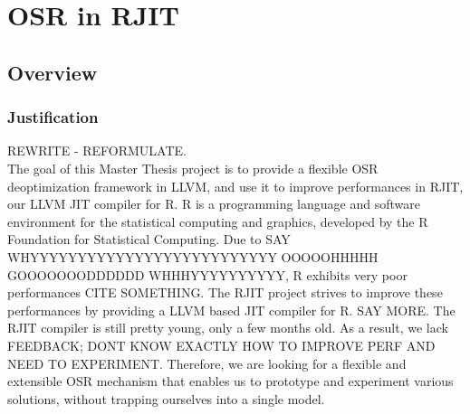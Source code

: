 
\chapter{OSR in RJIT} %

\label{Chapter4New} %


\newcommand{\keyword}[1]{\textbf{#1}}
\newcommand{\tabhead}[1]{\textbf{#1}}
\newcommand{\code}[1]{\texttt{#1}}
\newcommand{\file}[1]{\texttt{\bfseries#1}}
\newcommand{\option}[1]{\texttt{\itshape#1}}

\section{Overview}
\subsection{Justification}
REWRITE - REFORMULATE.\\
            

The goal of this Master Thesis project is to provide a flexible OSR deoptimization framework in LLVM, and use it to improve performances in RJIT, our LLVM JIT compiler for R.
R is a programming language and software environment for the statistical computing and graphics, developed by the R Foundation for Statistical Computing\cite{RURL}.
Due to SAY WHYYYYYYYYYYYYYYYYYYYYYYYYYY OOOOOHHHHH GOOOOOOODDDDDD WHHHYYYYYYYYYY, R exhibits very poor performances CITE SOMETHING.
The RJIT project strives to improve these performances by providing a LLVM based JIT compiler for R. SAY MORE.
The RJIT compiler is still pretty young, only a few months old.
As a result, we lack FEEDBACK; DONT KNOW EXACTLY HOW TO IMPROVE PERF AND NEED TO EXPERIMENT.
Therefore, we are looking for a flexible and extensible OSR mechanism that enables us to prototype and experiment various solutions, without trapping ourselves into a single model.\\

